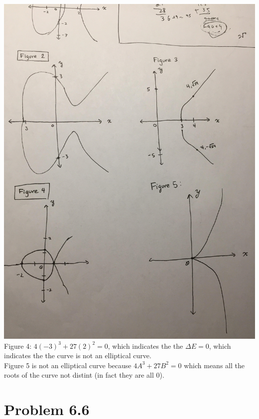 \documentclass[10pt]{amsart}
\begin{document}
\includegraphics[scale=0.08]{graphs2} \\

\noindent Figure 4: $4(-3)^3 + 27(2)^2 = 0$, which indicates the the $\Delta E = 0$,
which indicates the the curve is not an elliptical curve. \\
Figure 5 is not an elliptical curve because $4A^3 + 27B^2 = 0$ which means all
the roots of the curve not distint (in fact they are all 0).\\

\section*{\small Problem 6.6}
\end{document}
